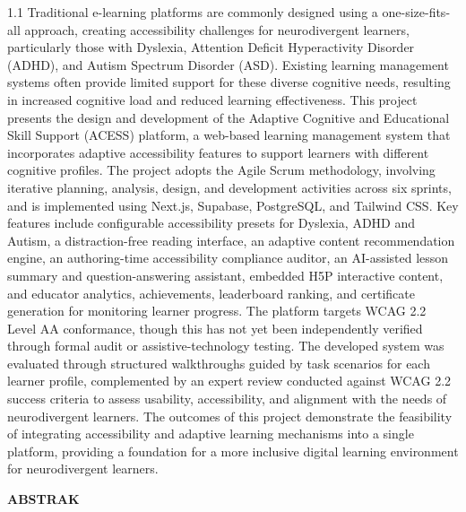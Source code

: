 \documentclass[12pt, oneside]{article} %
\begin{document}
\vspace{1cm}

\begin{spacing}{1.1}
Traditional e-learning platforms are commonly designed using a one-size-fits-all approach, creating accessibility challenges for neurodivergent learners, particularly those with Dyslexia, Attention Deficit Hyperactivity Disorder (ADHD), and Autism Spectrum Disorder (ASD). Existing learning management systems often provide limited support for these diverse cognitive needs, resulting in increased cognitive load and reduced learning effectiveness. This project presents the design and development of the Adaptive Cognitive and Educational Skill Support (ACESS) platform, a web-based learning management system that incorporates adaptive accessibility features to support learners with different cognitive profiles. The project adopts the Agile Scrum methodology, involving iterative planning, analysis, design, and development activities across six sprints, and is implemented using Next.js, Supabase, PostgreSQL, and Tailwind CSS. Key features include configurable accessibility presets for Dyslexia, ADHD and Autism, a distraction-free reading interface, an adaptive content recommendation engine, an authoring-time accessibility compliance auditor, an AI-assisted lesson summary and question-answering assistant, embedded H5P interactive content, and educator analytics, achievements, leaderboard ranking, and certificate generation for monitoring learner progress. The platform targets WCAG 2.2 Level AA conformance, though this has not yet been independently verified through formal audit or assistive-technology testing. The developed system was evaluated through structured walkthroughs guided by task scenarios for each learner profile, complemented by an expert review conducted against WCAG 2.2 success criteria to assess usability, accessibility, and alignment with the needs of neurodivergent learners. The outcomes of this project demonstrate the feasibility of integrating accessibility and adaptive learning mechanisms into a single platform, providing a foundation for a more inclusive digital learning environment for neurodivergent learners.
\end{spacing}

\vfill \null

\newpage

\begin{center}
\vfill \null
{}
{}
\textbf{ABSTRAK}
\end{center}
\end{document}
